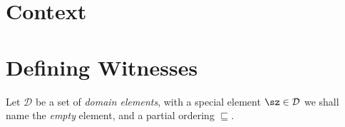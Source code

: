 

\section{Context} %


\section{Defining Witnesses} %

Let $\mathcal{D}$ be a set of \emph{domain elements}, with a special element $\sz \in \mathcal{D}$ we shall name the \emph{empty} element, and a partial ordering $\sqsubseteq$. 

